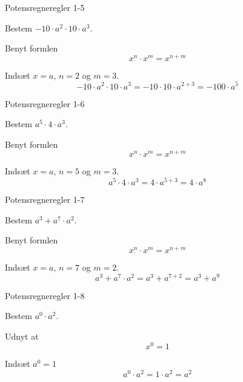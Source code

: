 \documentclass{article}
\begin{document}
\newpage

\begin{exercise}{Potensregneregler 1-5}

Bestem $ -10 \cdot a^2 \cdot 10 \cdot a^3$.


\hint

Benyt formlen
\[
x^n \cdot x^m = x^{n + m}
\]

\hint

Indsæt $x=a$, $n=2$ og $m=3$.
\[
-10 \cdot a^2 \cdot 10 \cdot a^3 = -10 \cdot 10 \cdot a^{2 + 3} = -100 \cdot a^5
\]

\end{exercise}

\newpage

\begin{exercise}{Potensregneregler 1-6}

Bestem $a^5 \cdot 4 \cdot a^3$.


\hint

Benyt formlen
\[
x^n \cdot x^m = x^{n + m}
\]

\hint

Indsæt $x=a$, $n=5$ og $m=3$.
\[
a^5 \cdot 4 \cdot a^3 = 4 \cdot a^{5 + 3} = 4 \cdot a^8
\]

\end{exercise}

\newpage

\begin{exercise}{Potensregneregler 1-7}

Bestem $a^3 + a^7 \cdot a^2$.


\hint

Benyt formlen
\[
x^n \cdot x^m = x^{n + m}
\]

\hint

Indsæt $x=a$, $n=7$ og $m=2$.
\[
a^3 + a^7 \cdot a^2 = a^3 + a^{7 + 2} = a^3 + a^9
\]

\end{exercise}

\newpage

\begin{exercise}{Potensregneregler 1-8}

Bestem $a^0 \cdot a^2$.


\hint

Udnyt at
\[
x^0 = 1
\]

\hint

Indsæt $a^0=1$
\[
a^0 \cdot a^2 = 1 \cdot a^2 = a^2
\]

\end{exercise}
\end{document}
